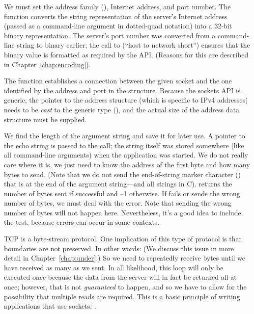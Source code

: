 \begin{topcode}
\begin{bottomcode}
We must set the address family (), Internet
address, and port number.  The function 
converts the string representation of the server's Internet address
(passed as a command-line argument in dotted-quad notation)
into a 32-bit binary representation.  The server's port
number was converted from a command-line string to binary earlier;
the call to  (``host to network short'')
ensures that the binary value is formatted as required by the API.
(Reasons for this are described in Chapter~\ref{chap:encoding}).


The  function establishes a
connection between the given socket and the one identified by the address
and port in the  structure.  Because
the sockets API is
generic, the pointer to the  address
structure (which is specific to IPv4 addresses)
needs to be \emph{cast\/} to the generic type (),
and the actual size of the address data structure must be supplied.

\end{bottomcode}


We find the length of the argument string and save it for later use.
A pointer to the echo string is passed to the
 call; the string itself was stored somewhere (like all
command-line arguments) when the application was started.  We do not
really care where it is, we just need to know the address of the first
byte and how many bytes to send.  (Note that we do
not send the end-of-string marker character (\termchar) that is at the end of
the argument string---and all strings in C).
 returns the
number of bytes sent if successful and --1 otherwise.  If 
fails or sends the wrong number of bytes, we must deal with the error.  Note
that sending the wrong number of bytes will not happen here.
Nevertheless, it's a good idea to include
the test, because errors can occur in some contexts.


TCP is a byte-stream protocol.  One implication of this type of
protocol is that  boundaries are not preserved.
In other words:
(We discuss this issue in more detail in Chapter~\ref{chap:under}.)
So we need to repeatedly receive bytes until we have received as many
as we sent.  In all likelihood, this loop will only be executed once
because the data from the server will in fact be returned all at once;
however, that is not \emph{guaranteed} to happen, and so we have to
allow for the possibility that multiple reads are required.  This is a
basic principle of writing applications that use sockets:
.


\end{topcode}
